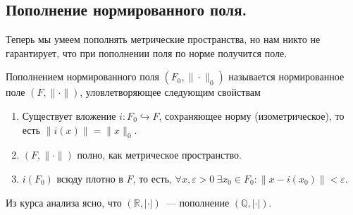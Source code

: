 \documentclass[11pt]{article}
\begin{document}
    \subsection{Пополнение нормированного поля.}
    Теперь мы умеем пополнять метрические пространства, но нам никто не гарантирует, что при пополнении поля по норме получится поле.
    \begin{definition}
        Пополнением нормированного поля $(F_0, \| \cdot \|_0 )$ называется нормированное поле $(F, \| \cdot \|)$,
        уловлетворяющее следующим свойствам
        \begin{enumerate}
            \item Существует вложение $i\colon F_0 \hookrightarrow F$, сохраняющее норму (изометрическое), то есть $\| i(x) \| = \| x \|_0$.

            \item $(F, \| \cdot \|)$ полно, как метрическое пространство.

            \item $i(F_0)$ всюду плотно в $F$, то есть, $\forall x,  \varepsilon > 0 \ \exists x_0 \in F_0\colon \| x - i(x_0)\| < \varepsilon$.
        \end{enumerate}
    \end{definition}

    \begin{example}
        Из курса анализа ясно, что $(\mathbb{R}, |\cdot|)$~--- пополнение $(\mathbb{Q}, |\cdot|)$.
    \end{example}
\end{document}

